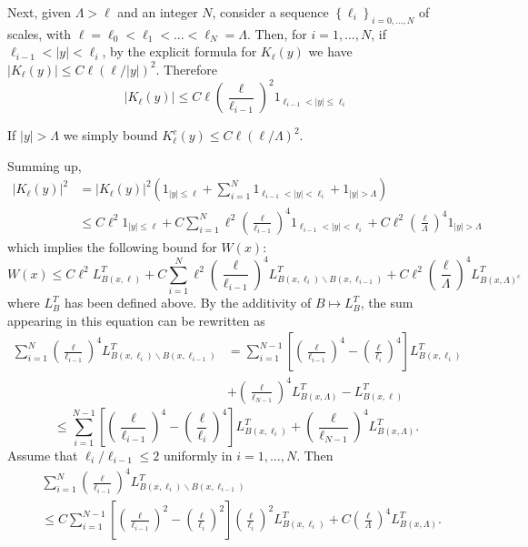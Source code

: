 \documentclass[a4paper,12pt]{article}
\begin{document}
Next, given $\Lambda>\ell$ and an integer $N$, consider a sequence $\left\{
\ell_{i}\right\}  _{i=0,...,N}$ of scales, with $\ell=\ell_{0}<\ell
_{1}<...<\ell_{N}=\Lambda$. Then, for $i=1,\dots,N$, if $\ell_{i-1}%
<|y|<\ell_{i}$, by the explicit formula for $K_{\ell}(y)$ we have $|K_{\ell
}(y)|\leq C\ell(\ell/|y|)^{2}$. Therefore
\[
|K_{\ell}(y)|\leq C\ell\left(  \frac{\ell}{\ell_{i-1}}\right)  ^{2}%
1_{\ell_{i-1}<|y|\leq\ell_{i}}%
\]

If $|y|>\Lambda$ we simply bound $K_{\ell}^{e}(y)\leq C\ell(\ell/\Lambda)^{2}
$.

Summing up,
\begin{align*}
\left|  K_{\ell}(y)\right|  ^{2}  &  =\left|  K_{\ell}(y)\right|  ^{2}\left(
1_{|y|\leq\ell}+\sum_{i=1}^{N}1_{\ell_{i-1}<|y|<\ell_{i}}+1_{|y|>\Lambda
}\right) \\
&  \leq C\ell^{2}1_{|y|\leq\ell}+C\sum_{i=1}^{N}\ell^{2}\left(  \frac{\ell
}{\ell_{i-1}}\right)  ^{4}1_{\ell_{i-1}<|y|<\ell_{i}}+C\ell^{2}\left(
\frac{\ell}{\Lambda}\right)  ^{4}1_{|y|>\Lambda}%
\end{align*}
which implies the following bound for $W(x)$:
\[
W(x)\leq C\ell^{2}L_{B(x,\ell)}^{T}+C\sum_{i=1}^{N}\ell^{2}\left(  \frac{\ell
}{\ell_{i-1}}\right)  ^{4}L_{B(x,\ell_{i})\backslash B(x,\ell_{i-1})}%
^{T}+C\ell^{2}\left(  \frac{\ell}{\Lambda}\right)  ^{4}L_{B(x,\Lambda)^{c}%
}^{T}%
\]
where $L_{B}^{T}$ has been defined above. By the additivity of $B\mapsto
L_{B}^{T}$, the sum appearing in this equation can be rewritten as
\begin{align*}
\sum_{i=1}^{N}\left(  \frac{\ell}{\ell_{i-1}}\right)  ^{4}L_{B(x,\ell
_{i})\backslash B(x,\ell_{i-1})}^{T}  &  =\sum_{i=1}^{N-1}\left[  \left(
\frac{\ell}{\ell_{i-1}}\right)  ^{4}-\left(  \frac{\ell}{\ell_{i}}\right)
^{4}\right]  L_{B(x,\ell_{i})}^{T}\\
&  +\left(  \frac{\ell}{\ell_{N-1}}\right)  ^{4}L_{B(x,\Lambda)}%
^{T}-L_{B(x,\ell)}^{T}%
\end{align*}%
\[
\leq\sum_{i=1}^{N-1}\left[  \left(  \frac{\ell}{\ell_{i-1}}\right)
^{4}-\left(  \frac{\ell}{\ell_{i}}\right)  ^{4}\right]  L_{B(x,\ell_{i})}%
^{T}+\left(  \frac{\ell}{\ell_{N-1}}\right)  ^{4}L_{B(x,\Lambda)}^{T}.
\]
Assume that $\ell_{i}/\ell_{i-1}\leq2$ uniformly in $i=1,\dots,N$. Then
\begin{align*}
&  \sum_{i=1}^{N}\left(  \frac{\ell}{\ell_{i-1}}\right)  ^{4}L_{B(x,\ell
_{i})\backslash B(x,\ell_{i-1})}^{T}\\
&  \leq C\sum_{i=1}^{N-1}\left[  \left(  \frac{\ell}{\ell_{i-1}}\right)
^{2}-\left(  \frac{\ell}{\ell_{i}}\right)  ^{2}\right]  \left(  \frac{\ell
}{\ell_{i}}\right)  ^{2}L_{B(x,\ell_{i})}^{T}+C\left(  \frac{\ell}{\Lambda
}\right)  ^{4}L_{B(x,\Lambda)}^{T}.
\end{align*}
\end{document}
